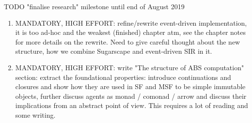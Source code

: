 \documentclass[oneside]{book}
\begin{document}

\bigskip

TODO "finalise research" milestone until end of August 2019
\begin{enumerate}
	\item MANDATORY, HIGH EFFORT: refine/rewrite event-driven implementation, it is too ad-hoc and the weakest (finished) chapter atm, see the chapter notes for more details on the rewrite. Need to give careful thought about the new structure, how we combine Sugarscape and event-driven SIR in it.
	
	\item MANDATORY, HIGH EFFORT: write "The structure of ABS computation" section: extract the foundational properties: introduce continuations and closures and show how they are used in SF and MSF to be simple immutable objects, further discuss agents as monad / comonad / arrow and discuss their implications from an abstract point of view. This requires a lot of reading and some writing.
\end{enumerate}
\end{document}
